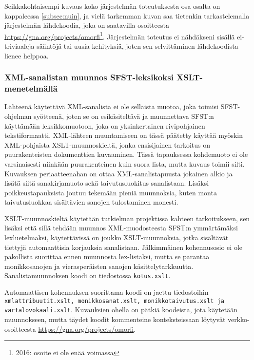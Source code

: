 \documentclass[free]{flammie}
\begin{document}
Seikkakohtaisempi kuvaus koko järjestelmän toteutuksesta osa osalta on
kappaleessa \ref{subsec:nuin}, ja vielä tarkemman kuvan saa tietenkin tarkastelemalla järjestelmän
lähdekoodia, joka on saatavilla osoitteesta
\url{https://gna.org/projects/omorfi}\footnote{2016: osoite ei ole enää voimassa}. Järjestelmän toteutus ei nähdäkseni sisällä ei-triviaaleja sääntöjä tai
uusia kehityksiä, joten sen selvittäminen lähdekoodista lienee helppoa.


\subsubsection{XML-sanalistan muunnos SFST-leksikoksi XSLT-menetelmällä}
\label{subsubsec:xslt}

Lähteenä käytettävä XML-sanalista ei ole sellaista muotoa, joka toimisi SFST-ohjelman syötteenä, joten se on esikäsiteltävä ja muunnettava SFST:n käyttämään
leksikkomuotoon, joka on yksinkertainen rivipohjainen tekstiformaatti.
XML-lähteen muuntamiseen on tässä päätetty käyttää myöskin XML-pohjaista XSLT-muunnoskieltä, jonka ensisijainen tarkoitus on puurakenteisten dokumenttien kuvaaminen. Tässä tapauksessa kohdemuoto ei ole varsinaisesti niinkään puurakenteinen kuin suora lista, mutta kuvaus toimii silti. Kuvauksen periaatteenahan
on ottaa XML-sanalistapuusta jokainen alkio ja lisätä siitä sanakirjamuoto sekä
taivutusluokitus sanalistaan. Lisäksi poikkeustapauksista joutuu tekemään pieniä
muunnoksia, kuten monta taivutusluokkaa sisältävien sanojen tulostaminen monesti.

XSLT-muunnoskieltä käytetään tutkielman projektissa kahteen tarkoitukseen, sen
lisäksi että sillä tehdään muunnos XML-muodosteesta SFST:n ymmärtämäksi lexluetelmaksi, käytettävissä on joukko XSLT-muunnoksia, jotka sisältävät tiettyjä
automaattisia korjauksia sanalistaan. Jälkimmäinen kohennusosio ei ole pakollista suorittaa ennen muunnosta lex-listaksi, mutta se parantaa monikkosanojen
ja vierasperäisten sanojen käsittelytarkkuutta. Sanalistamuunnoksen koodi on
tiedostossa \texttt{kotus.xslt}.

Automaattisen kohennuksen suorittama koodi on jaettu tiedostoihin
\texttt{xmlattribuutit.xslt, monikkosanat.xslt, monikkotaivutus.xslt ja
vartalovokaali.xslt}.  Kuvauksien ohella on pätkiä koodeista, jota käytetään
muunnokseen, mutta täydet koodit kommenteine konteksteissaan löytyvät
verkko-osoitteesta \url{https://gna.org/projects/omorfi}.
\end{document}
